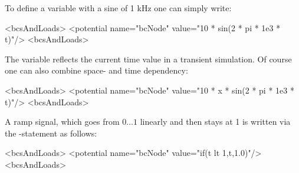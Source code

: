 \noindent
To define a variable with a sine of 1 kHz one can simply write:
\begin{xmllisting}
<bcsAndLoads>
  <potential name="bcNode" value="10 * sin(2 * pi * 1e3 * t)"/>
<bcsAndLoads>
\end{xmllisting}
The variable  reflects the current time value in a transient
simulation.
Of course one can also combine space- and time dependency:
\begin{xmllisting}
<bcsAndLoads>
  <potential name="bcNode" value="10 * x * sin(2 * pi * 1e3 * t)"/>
<bcsAndLoads>
\end{xmllisting}
A ramp signal, which goes from $0 \ldots 1$ linearly and then
stays at 1 is written via the -statement as follows:
\begin{xmllisting}
<bcsAndLoads>
  <potential name="bcNode" value="if(t lt 1,t,1.0)"/>
<bcsAndLoads>
\end{xmllisting}

